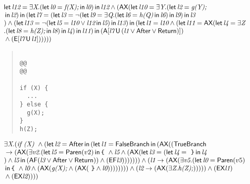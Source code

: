 \documentclass{article}
\newcommand{\U}{\,\mbox{\sf{U}}\,}
\newcommand{\A}{\mbox{\sf{A}}}
\newcommand{\E}{\mbox{\sf{E}}}
\newcommand{\AX}{\mbox{\sf{AX}}}
\newcommand{\EX}{\mbox{\sf{EX}}}
\newcommand{\AF}{\mbox{\sf{AF}}}
\newcommand{\EF}{\mbox{\sf{EF}}}
\newcommand{\mita}[1]{\mbox{\it{{#1}}}}
\newcommand{\msf}[1]{\mbox{\sf{{#1}}}}
\newcommand{\ttlb}{\mbox{\tt \char'173}}
\newcommand{\ttrb}{\mbox{\tt \char'175}}
\begin{document}
\[\begin{array}{l}
\mita{\sf{let}} \, \mita{l12} = \exists \mita{X} . (\mita{\sf{let}} \, \mita{l0} = \mita{f(X);} \, \mita{\sf{in}} \, \mita{l0}
) \, \mita{\sf{in}} \, \mita{l12} \wedge (\AX(\mita{\sf{let}} \, \mita{l10} = \exists \mita{Y} . (\mita{\sf{let}} \, \mita{l2} = \mita{g(Y);}\\\mbox{} \, \mita{\sf{in}} \, \mita{l2}
) \, \mita{\sf{in}} \, (\mita{\sf{let}} \, \mita{l7} = (\mita{\sf{let}} \, \mita{l3} = \neg (\mita{\sf{let}} \, \mita{l9} = \exists \mita{Q} . (\mita{\sf{let}} \, \mita{l6} = \mita{h(Q)} \, \mita{\sf{in}} \, \mita{l6}
) \, \mita{\sf{in}} \, \mita{l9}
) \, \mita{\sf{in}} \, \mita{l3}\\\mbox{}
) \wedge (\mita{\sf{let}} \, \mita{l13} = \neg (\mita{\sf{let}} \, \mita{l5} = \mita{l10} \vee \mita{l12} \, \mita{\sf{in}} \, \mita{l5}
) \, \mita{\sf{in}} \, \mita{l13}
) \, \mita{\sf{in}} \, (\mita{\sf{let}} \, \mita{l1} = \mita{l10} \wedge (\mita{\sf{let}} \, \mita{l11} = \AX(\mita{\sf{let}} \, \mita{l4} = \exists \mita{Z}\\\mbox{} . (\mita{\sf{let}} \, \mita{l8} = \mita{h(Z);} \, \mita{\sf{in}} \, \mita{l8}
) \, \mita{\sf{in}} \, \mita{l4}
) \, \mita{\sf{in}} \, \mita{l11}
) \, \mita{\sf{in}} \, (\A[\mita{l7} \U (\mita{l1} \vee \msf{After} \vee \msf{Return})]
)\\\mbox{} \wedge (\E[\mita{l7} \U \mita{l1}]
)
)
)
))

\end{array}\]

\begin{quote}\begin{verbatim}

@@
@@

if (X) {
  ...
} else {
  g(X);
}
h(Z);
\end{verbatim}\end{quote}

\[\begin{array}{l}
\exists \mita{X} . (\mita{if (X) } \wedge (\mita{\sf{let}} \, \mita{l2} = \msf{After} \, \mita{\sf{in}} \, (\mita{\sf{let}} \, \mita{l1} = \msf{FalseBranch} \, \mita{\sf{in}} \, (\AX((\msf{TrueBranch}\\\mbox{} \rightarrow (\AX(\exists \mita{v2} . (\mita{\sf{let}} \, \mita{l5} = \msf{Paren}(v2) \, \mita{\sf{in}} \, \mita{{\ttlb}
  } \wedge \mita{l5} \wedge (\AX(\mita{\sf{let}} \, \mita{l3} = (\mita{\sf{let}} \, \mita{l4} = \mita{
{\ttrb}} \, \mita{\sf{in}} \, \mita{l4}\\\mbox{}
) \wedge \mita{l5} \, \mita{\sf{in}} \, (\AF(\mita{l3} \vee \msf{After} \vee \msf{Return})) \wedge (\EF\mita{l3})
))
)))) \wedge (\mita{l1} \rightarrow (\AX(\exists \mita{v5} . (\mita{\sf{let}} \, \mita{l0} = \msf{Paren}(v5)\\\mbox{} \, \mita{\sf{in}} \, \mita{{\ttlb}
  } \wedge \mita{l0} \wedge (\AX(\mita{g(X);} \wedge (\AX(\mita{
{\ttrb}} \wedge \mita{l0}))))
)))) \wedge (\mita{l2} \rightarrow (\AX(\exists \mita{Z} . \mita{h(Z);}))))) \wedge (\EX\mita{l1})\\\mbox{} \wedge (\EX\mita{l2})
)
))
\end{array}\]
\end{document}
